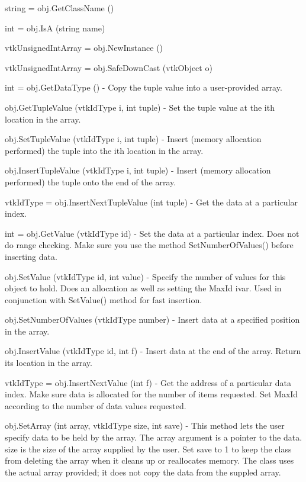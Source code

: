 \begin{DoxyItemize}
\item {\ttfamily string = obj.\-Get\-Class\-Name ()}  
\item {\ttfamily int = obj.\-Is\-A (string name)}  
\item {\ttfamily vtk\-Unsigned\-Int\-Array = obj.\-New\-Instance ()}  
\item {\ttfamily vtk\-Unsigned\-Int\-Array = obj.\-Safe\-Down\-Cast (vtk\-Object o)}  
\item {\ttfamily int = obj.\-Get\-Data\-Type ()} -\/ Copy the tuple value into a user-\/provided array.  
\item {\ttfamily obj.\-Get\-Tuple\-Value (vtk\-Id\-Type i, int tuple)} -\/ Set the tuple value at the ith location in the array.  
\item {\ttfamily obj.\-Set\-Tuple\-Value (vtk\-Id\-Type i, int tuple)} -\/ Insert (memory allocation performed) the tuple into the ith location in the array.  
\item {\ttfamily obj.\-Insert\-Tuple\-Value (vtk\-Id\-Type i, int tuple)} -\/ Insert (memory allocation performed) the tuple onto the end of the array.  
\item {\ttfamily vtk\-Id\-Type = obj.\-Insert\-Next\-Tuple\-Value (int tuple)} -\/ Get the data at a particular index.  
\item {\ttfamily int = obj.\-Get\-Value (vtk\-Id\-Type id)} -\/ Set the data at a particular index. Does not do range checking. Make sure you use the method Set\-Number\-Of\-Values() before inserting data.  
\item {\ttfamily obj.\-Set\-Value (vtk\-Id\-Type id, int value)} -\/ Specify the number of values for this object to hold. Does an allocation as well as setting the Max\-Id ivar. Used in conjunction with Set\-Value() method for fast insertion.  
\item {\ttfamily obj.\-Set\-Number\-Of\-Values (vtk\-Id\-Type number)} -\/ Insert data at a specified position in the array.  
\item {\ttfamily obj.\-Insert\-Value (vtk\-Id\-Type id, int f)} -\/ Insert data at the end of the array. Return its location in the array.  
\item {\ttfamily vtk\-Id\-Type = obj.\-Insert\-Next\-Value (int f)} -\/ Get the address of a particular data index. Make sure data is allocated for the number of items requested. Set Max\-Id according to the number of data values requested.  
\item {\ttfamily obj.\-Set\-Array (int array, vtk\-Id\-Type size, int save)} -\/ This method lets the user specify data to be held by the array. The array argument is a pointer to the data. size is the size of the array supplied by the user. Set save to 1 to keep the class from deleting the array when it cleans up or reallocates memory. The class uses the actual array provided; it does not copy the data from the suppled array.  

\end{DoxyItemize}
